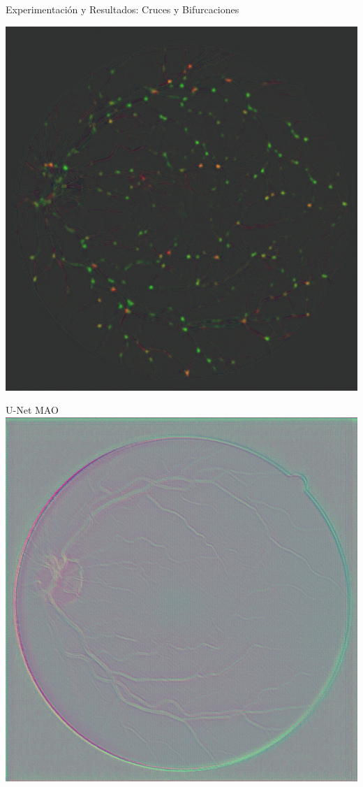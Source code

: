 \documentclass[xcolor=dvipsnames,table]{beamer}
\begin{document}
\begin{frame}{Experimentación y Resultados: Cruces y Bifurcaciones}
\begin{minipage}[b]{0.13\textwidth}
		\includegraphics[width=\linewidth]{my_images/video/XBUNETMTL.jpg}
	\end{minipage}\hfill
	\begin{minipage}[b]{0.13\textwidth}
		\centering
		U-Net MAO\\[0.2cm]
		\includegraphics[width=\linewidth]{my_images/video/XBUNETMAO.jpg}

\end{minipage}
\end{frame}
\end{document}
